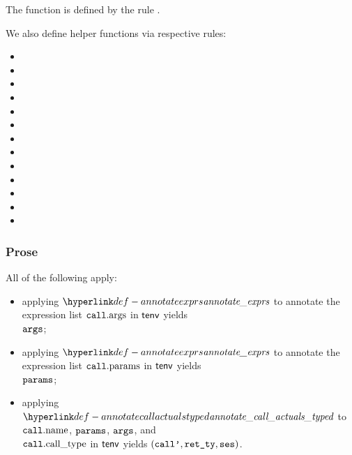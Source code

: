 The function is defined by the rule .

We also define helper functions via respective rules:
\begin{itemize}
  \item {}
  \item {}
  \item {}
  \item {}
  \item {}
  \item {}
  \item {}
  \item {}
  \item {}
  \item {}
  \item {}
  \item {}
  \item {}
\end{itemize}

\subsubsection{Prose}
All of the following apply:
\begin{itemize}
  \item applying $\annotateexprlist$ to annotate the expression list $\texttt{call}.\text{args}$ in $\textsf{tenv}$ yields \\
        $\texttt{args}$\ProseOrTypeError;
  \item applying $\annotateexprlist$ to annotate the expression list $\texttt{call}.\text{params}$ in $\textsf{tenv}$ yields \\
        $\texttt{params}$\ProseOrTypeError;
  \item applying $\annotatecallactualstyped$ to $\texttt{call}.\text{name}$, $\texttt{params}$, $\texttt{args}$, and \\
        $\texttt{call}.\text{call\_type}$ in $\textsf{tenv}$ yields $(\texttt{call'}, \texttt{ret\_ty}, \texttt{ses})$\ProseOrTypeError.
\end{itemize}

